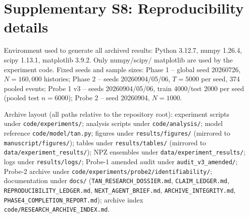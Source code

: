 \section{Supplementary S8: Reproducibility details}

Environment used to generate all archived results: Python 3.12.7,
numpy 1.26.4, scipy 1.13.1, matplotlib 3.9.2.  Only numpy/\allowbreak{}scipy/\allowbreak{}
matplotlib are used by the experiment code.  Fixed seeds and sample
sizes: Phase 1 -- global seed 20260726, $N = 160{,}000$ histories;
Phase 2 -- seeds 20260904/\allowbreak{}05/\allowbreak{}06, $T = 5000$ per seed, 374 pooled
events; Probe 1 v3 -- seeds 20260904/\allowbreak{}05/\allowbreak{}06, train 4000/\allowbreak{}test 2000 per
seed (pooled test $n = 6000$); Probe 2 -- seed 20260904, $N = 1000$.

Archive layout (all paths relative to the repository root):
experiment scripts under \texttt{code/\allowbreak{}experiments/\allowbreak{}}; analysis scripts under
\texttt{code/\allowbreak{}analysis/\allowbreak{}}; model reference \texttt{code/\allowbreak{}model/\allowbreak{}tan.py}; figures under
\texttt{results/\allowbreak{}figures/\allowbreak{}} (mirrored to \texttt{manuscript/\allowbreak{}figures/\allowbreak{}}); tables under
\texttt{results/\allowbreak{}tables/\allowbreak{}} (mirrored to \texttt{data/\allowbreak{}experiment\_\allowbreak{}\allowbreak{}results/\allowbreak{}}); NPZ
ensembles under \texttt{data/\allowbreak{}experiment\_\allowbreak{}\allowbreak{}results/\allowbreak{}}; logs under
\texttt{results/\allowbreak{}logs/\allowbreak{}}; Probe-1 amended audit under \texttt{audit\_\allowbreak{}\allowbreak{}v3\_\allowbreak{}\allowbreak{}amended/\allowbreak{}};
Probe-2 archive under
\texttt{code/\allowbreak{}experiments/\allowbreak{}probe2/\allowbreak{}identifiability/\allowbreak{}}; documentation under
\texttt{docs/\allowbreak{}} (\texttt{TAN\_\allowbreak{}\allowbreak{}RESEARCH\_\allowbreak{}\allowbreak{}DOSSIER.md}, \texttt{CLAIM\_\allowbreak{}\allowbreak{}LEDGER.md},
\texttt{REPRODUCIBILITY\_\allowbreak{}\allowbreak{}LEDGER.md}, \texttt{NEXT\_\allowbreak{}\allowbreak{}AGENT\_\allowbreak{}\allowbreak{}BRIEF.md},
\texttt{ARCHIVE\_\allowbreak{}\allowbreak{}INTEGRITY.md}, \texttt{PHASE4\_\allowbreak{}\allowbreak{}COMPLETION\_\allowbreak{}\allowbreak{}REPORT.md}); archive index
\texttt{code/\allowbreak{}RESEARCH\_\allowbreak{}\allowbreak{}ARCHIVE\_\allowbreak{}\allowbreak{}INDEX.md}.

